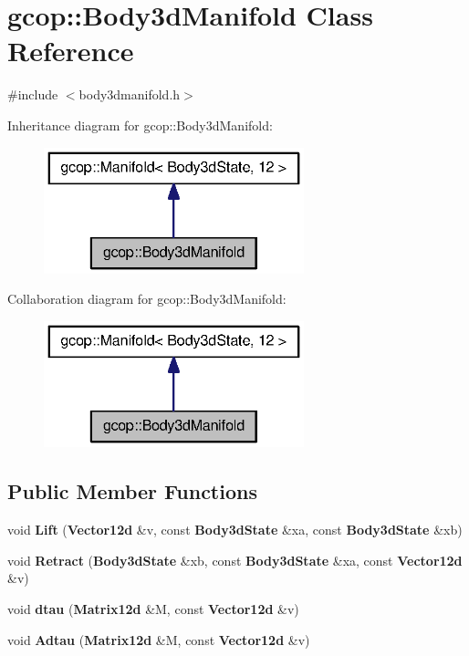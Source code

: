\section{gcop\-:\-:\-Body3d\-Manifold \-Class \-Reference}
\label{classgcop_1_1Body3dManifold}


{\ttfamily \#include $<$body3dmanifold.\-h$>$}



\-Inheritance diagram for gcop\-:\-:\-Body3d\-Manifold\-:
\nopagebreak
\begin{figure}[H]
\begin{center}
\leavevmode
\includegraphics[width=214pt]{classgcop_1_1Body3dManifold__inherit__graph}
\end{center}
\end{figure}


\-Collaboration diagram for gcop\-:\-:\-Body3d\-Manifold\-:
\nopagebreak
\begin{figure}[H]
\begin{center}
\leavevmode
\includegraphics[width=214pt]{classgcop_1_1Body3dManifold__coll__graph}
\end{center}
\end{figure}
\subsection*{\-Public \-Member \-Functions}
\begin{DoxyCompactItemize}
\item 
void {\bf \-Lift} ({\bf \-Vector12d} \&v, const {\bf \-Body3d\-State} \&xa, const {\bf \-Body3d\-State} \&xb)
\item 
void {\bf \-Retract} ({\bf \-Body3d\-State} \&xb, const {\bf \-Body3d\-State} \&xa, const {\bf \-Vector12d} \&v)
\item 
void {\bf dtau} ({\bf \-Matrix12d} \&\-M, const {\bf \-Vector12d} \&v)
\item 
void {\bf \-Adtau} ({\bf \-Matrix12d} \&\-M, const {\bf \-Vector12d} \&v)
\end{DoxyCompactItemize}
